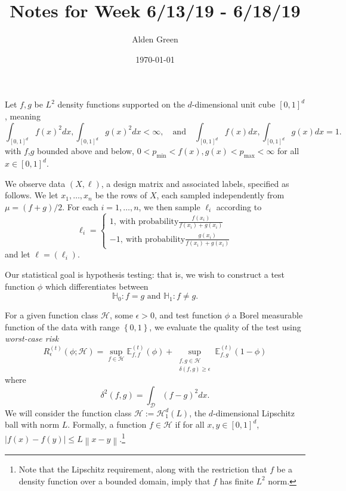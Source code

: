 \documentclass{article}
\newcommand{\norm}[1]{\left\lVert#1\right\rVert}
\newcommand{\abs}[1]{\left \lvert #1 \right \rvert}
\newcommand{\set}[1]{\left\{#1\right\}}
\newcommand{\1}{\mathbb{I}}
\newcommand{\D}{\mathcal{D}}
\newcommand{\Hclass}{\mathcal{H}}
\newcommand{\Ebb}{\mathbb{E}}
\theoremstyle{alden}
\theoremstyle{aldenthm}
\theoremstyle{definition}
\theoremstyle{remark}
\begin{document}
\title{Notes for Week 6/13/19 - 6/18/19}
\author{Alden Green}
\date{\today}
\maketitle

Let $f,g$ be $L^2$ density functions supported on the $d$-dimensional unit cube $[0,1]^d$, meaning
\begin{equation*}
\int_{[0,1]^d} f(x)^2 dx, \int_{[0,1]^d} g(x)^2 dx < \infty, \quad \text{and} \quad \int_{[0,1]^d} f(x) dx, \int_{[0,1]^d} g(x) dx = 1.
\end{equation*}
with $f$,$g$ bounded above and below, $0 < p_{\min} < f(x), g(x) < p_{\max} < \infty$ for all $x \in [0,1]^d$.

We observe data $(X,\ell)$, a design matrix and associated labels, specified as follows. We let $x_1, \ldots, x_n$ be the rows of $X$, each sampled independently from $\mu = (f + g)/2$. For each $i = 1,\ldots,n$, we then sample $\ell_i$ according to
\begin{equation*}
\ell_i =
\begin{cases}
1,~ \textrm{with probability} \frac{f(x_i)}{f(x_i) + g(x_i)} \\
-1,~ \textrm{with probability} \frac{g(x_i)}{f(x_i) + g(x_i)}
\end{cases}
\end{equation*}
and let $\ell = (\ell_i)$. 

Our statistical goal is hypothesis testing: that is, we wish to construct a test function $\phi$ which differentiates between
\begin{equation*}
\mathbb{H}_0: f = g \text{ and } \mathbb{H}_1: f \neq g.
\end{equation*}

For a given function class $\Hclass$, some $\epsilon > 0$, and test function $\phi$ a Borel measurable function of the data with range $\set{0,1}$, we evaluate the quality of the test using \emph{worst-case risk}
\begin{equation*}
R_{\epsilon}^{(t)}(\phi; \Hclass) = \sup_{f \in \Hclass} \Ebb_{f,f}^{(t)}(\phi) + \sup_{ \substack{f,g \in \Hclass \\ \delta(f,g) \geq \epsilon } } \Ebb_{f,g}^{(t)}(1 - \phi)
\end{equation*} 
where 
\begin{equation*}
\delta^2(f,g) = \int_{\D} (f - g)^2 dx.
\end{equation*}
We will consider the function class $\mathcal{H} := \mathcal{H}_{1}^d(L)$, the $d$-dimensional Lipschitz ball with norm $L$. Formally, a function $f \in \mathcal{H}$ if for all $x,y \in [0,1]^d$, $\abs{f(x) - f(y)} \leq L \norm{x - y}$.\footnote{Note that the Lipschitz requirement, along with the restriction that $f$ be a density function over a bounded domain, imply that $f$ has finite $L^2$ norm.}
\end{document}
